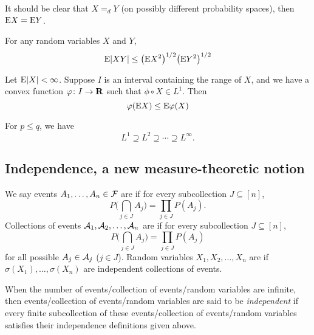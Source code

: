 It should be clear that $X =_d Y$ (on possibly different probability spaces), then $\mathop{}\!\mathrm{E} X = \mathop{}\!\mathrm{E} Y$.

\begin{namedthm} \label{thm:c-s-ineq-prob} For any random variables $X$ and $Y$, 
    \[\mathop{}\!\mathrm{E} \lvert XY \rvert \leq \bigl(\mathop{}\!\mathrm{E} X^2\bigr)^{1/2} \bigl(\mathop{}\!\mathrm{E} Y^2\bigr)^{1/2}\]
\end{namedthm}

\begin{namedthm} \label{thm:Jensen-prob}
    Let $\mathop{}\!\mathrm{E}\lvert X \rvert <\infty$. Suppose $I$ is an interval containing the range of $X$, and we have a convex function $\varphi\colon I\to \mathbf{R}$ such that $\phi\circ X\in L^1$. Then \[
        \varphi(\mathop{}\!\mathrm{E} X) \leq \mathop{}\!\mathrm{E} \varphi(X)
    \]
\end{namedthm}
    
\begin{namedthm}
For $p \leq q$, we have 
    \[L^1 \supseteq L^2 \supseteq \dotsb \supseteq L^\infty.\]
\end{namedthm}

\subsection{Independence, a new measure-theoretic notion}

\begin{defn}
    We say events $A_1,\dotsc,A_n \in \mathcal{F}$ are  if for every subcollection $J \subseteq [n]$, \[
    P\biggl(\bigcap_{j\in J} A_j\biggr) = \prod_{j\in J} P(A_j).
\] %
Collections of events $\mathcal{A}_1,\mathcal{A}_2,\dotsc,\mathcal{A}_n$ are  if for every subcollection $J \subseteq [n]$, \[
    P\biggl(\bigcap_{j \in J} A_j\biggr) = \prod_{j\in J}P(A_j)
\] for all possible $A_j \in \mathcal{A}_j$ ($j \in J$).
Random variables $X_1,X_2,\dotsc,X_n$ are  if $\sigma(X_1),\dotsc,\sigma(X_n)$ are independent collections of events.

When the number of events/collection of events/random variables are infinite, then events/collection of events/random variables are said to be \emph{independent} if every finite subcollection of these events/collection of events/random variables satisfies their independence definitions given above.
\end{defn}

